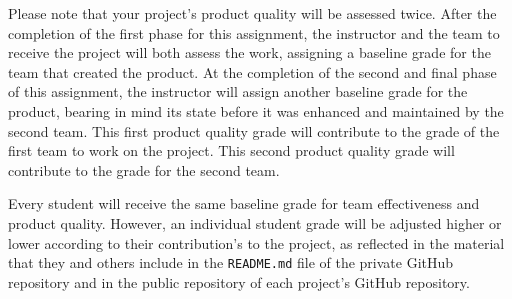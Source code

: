 \documentclass[11pt]{article}
\newcommand{\reflection}{\lstinline{README.md}}
\begin{document}
Please note that your project's product quality will be assessed twice. After the completion of the first phase for this
assignment, the instructor and the team to receive the project will both assess the work, assigning a baseline grade for
the team that created the product. At the completion of the second and final phase of this assignment, the instructor
will assign another baseline grade for the product, bearing in mind its state before it was enhanced and maintained by
the second team. This first product quality grade will contribute to the grade of the first team to work on the project.
This second product quality grade will contribute to the grade for the second team.

Every student will receive the same baseline grade for team effectiveness and product quality. However, an individual
student grade will be adjusted higher or lower according to their contribution's to the project, as reflected in the
material that they and others include in the \reflection{} file of the private GitHub repository and in the public
repository of each project's GitHub repository.





\end{document}
